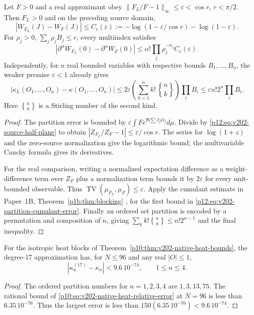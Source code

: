 \documentclass[12pt,a4paper]{article}
\begin{document}
\begin{theorem}
\label{p12:thm:v202-source-errors}
Let $F>0$ and a real approximant obey
$\|F_L/F-1\|_\infty\le\varepsilon<\cos r$, $r<\pi/2$.
Then $F_L>0$ and on the preceding source domain,
\begin{equation}
 |W_{F_L}(J)-W_F(J)|\le C_r(\varepsilon)
 :=-\log(1-\varepsilon/\cos r)-\log(1-\varepsilon).
 \label{p12:eq:v202-source-log-error}
\end{equation}
For $\rho_j>0$, $\sum_j\rho_jB_j\le r$, every multiindex satisfies
\[
 |\partial^\alpha W_{F_L}(0)-\partial^\alpha W_F(0)|
 \le\alpha!\prod_j\rho_j^{-\alpha_j}C_r(\varepsilon).
\]
Independently, for $n$ real bounded variables with respective bounds
$B_1,\ldots,B_n$, the weaker premise $\varepsilon<1$ already gives
\begin{equation}
 |\kappa_L(O_1,\ldots,O_n)-\kappa(O_1,\ldots,O_n)|
 \le2\varepsilon\!\left(\sum_{k=1}^n k!\,{n\brace k}\right)
       \prod_i B_i
 \le\varepsilon n!2^n\prod_iB_i.
 \label{p12:eq:v202-partition-cumulant-error}
\end{equation}
Here ${n\brace k}$ is a Stirling number of the second kind.
\end{theorem}
\begin{proof}
The partition error is bounded by
$\varepsilon\int F e^{\Re\sum J_jO_j}d\mu$. Divide by
\eqref{p12:eq:v202-source-half-plane} to obtain
$|Z_{F_L}/Z_F-1|\le\varepsilon/\cos r$. The series for
$\log(1+z)$ and the zero-source normalization give the logarithmic
bound; the multivariable Cauchy formula gives its derivatives.

For the real comparison, writing a normalized expectation difference
as a weight-difference term over $Z_F$ plus a normalization term bounds
it by $2\varepsilon$ for every unit-bounded observable. Thus
$\operatorname{TV}(\mu_{F_L},\mu_F)\le\varepsilon$. Apply the
cumulant estimate in Paper~1B, Theorem~\ref{p1b:thm:blocking}
\cite{Kugelmann2026Paper1B}, for the first bound in
\eqref{p12:eq:v202-partition-cumulant-error}. Finally an ordered set
partition is encoded by a permutation and composition of $n$, giving
$\sum_k k!{n\brace k}\le n!2^{n-1}$ and the final inequality.
\end{proof}

\begin{corollary}
\label{p12:cor:v202-native-cumulants}
For the isotropic heat blocks of
Theorem~\ref{p10:thm:v202-native-heat-bounds}, the degree-17 approximation
has, for $N\le96$ and any real $|O|\le1$,
\begin{equation}
 |\kappa_n^{(17)}-\kappa_n|<9.6\,10^{-74},\qquad 1\le n\le4.
 \label{p12:eq:v202-native-cumulant-margin}
\end{equation}
\end{corollary}
\begin{proof}
The ordered partition numbers for $n=1,2,3,4$ are $1,3,13,75$.
The rational bound of \eqref{p10:eq:v202-native-heat-relative-error} at
$N=96$ is less than $6.35\,10^{-76}$. Thus the largest error is less
than $150(6.35\,10^{-76})<9.6\,10^{-74}$.
\end{proof}
\end{document}
